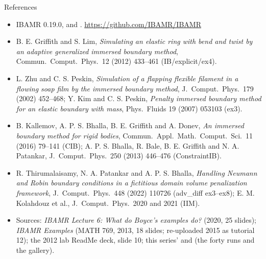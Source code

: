\documentclass[aspectratio=169,11pt]{beamer}
\begin{document}
\begin{frame}{References}
\label{fr:refs}
\scriptsize
\begin{itemize}
  \item IBAMR 0.19.0,  and . \url{https://github.com/IBAMR/IBAMR}
  \item B. E. Griffith and S. Lim, \emph{Simulating an elastic ring with bend and twist by an adaptive generalized immersed boundary method}, Commun.\ Comput.\ Phys.\ 12 (2012) 433--461 (IB/explicit/ex4).
  \item L. Zhu and C. S. Peskin, \emph{Simulation of a flapping flexible filament in a flowing soap film by the immersed boundary method}, J.\ Comput.\ Phys.\ 179 (2002) 452--468; Y. Kim and C. S. Peskin, \emph{Penalty immersed boundary method for an elastic boundary with mass}, Phys.\ Fluids 19 (2007) 053103 (ex3).
  \item B. Kallemov, A. P. S. Bhalla, B. E. Griffith and A. Donev, \emph{An immersed boundary method for rigid bodies}, Commun.\ Appl.\ Math.\ Comput.\ Sci.\ 11 (2016) 79--141 (CIB); A. P. S. Bhalla, R. Bale, B. E. Griffith and N. A. Patankar, J.\ Comput.\ Phys.\ 250 (2013) 446--476 (ConstraintIB).
  \item R. Thirumalaisamy, N. A. Patankar and A. P. S. Bhalla, \emph{Handling Neumann and Robin boundary conditions in a fictitious domain volume penalization framework}, J.\ Comput.\ Phys.\ 448 (2022) 110726 (adv\_diff ex3--ex8); E. M. Kolahdouz et al., J.\ Comput.\ Phys.\ 2020 and 2021 (IIM).
  \item Sources: \emph{IBAMR Lecture 6: What do Boyce's examples do?} (2020, 25 slides); \emph{IBAMR Examples} (MATH 769, 2013, 18 slides; re-uploaded 2015 as tutorial 12); the 2012 lab ReadMe deck, slide 10; this series'  and  (the forty runs and the gallery).
\end{itemize}
\end{frame}
\end{document}

